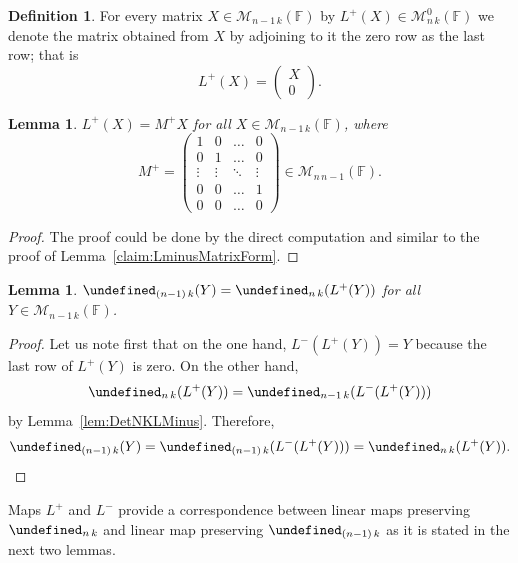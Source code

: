 \documentclass{elsarticle}
\def\F{{\mathbb F}}
\def\M{{\mathcal M}}
\let\det\undefined
\DeclareMathOperator{\det}{det}
\theoremstyle{plain}
\newtheorem{lemma}[theorem]{Lemma}
\theoremstyle{definition}
\newtheorem{definition}[theorem]{Definition}
\numberwithin{equation}{section}
\begin{document}
\begin{definition}\label{def:Lplus}
For every matrix $X \in \M_{n-1\,k}(\mathbb F)$ by $L^{+}(X) \in \M^0_{n\,k} (\mathbb F)$ we denote the matrix obtained from $X$ by adjoining to it the zero row as the last row; that is
\[
L^{+}(X) = \begin{pmatrix}X\\ 0
\end{pmatrix}.
\]
\end{definition}

\begin{lemma}\label{claim:LplusMatrixForm}$L^{+}(X) = M^{+}X$ for all $X \in \M_{n-1\,k}(\F)$, where
\[
M^{+} =
\begin{pmatrix}
1 & 0 & \ldots & 0\\
0 & 1 & \ldots & 0\\
\vdots & \vdots & \ddots & \vdots\\
0 & 0 & \ldots & 1\\
0 & 0 & \ldots & 0
\end{pmatrix}
\in \M_{n\,n-1}(\F).
\]
  \end{lemma}
  \begin{proof}The proof could be done by the direct computation and similar to the proof of Lemma~\ref{claim:LminusMatrixForm}.
  \end{proof}

\begin{lemma}\label{lem:DetNKLPlus}$\det_{(n-1)\,k}(Y) = \det_{n\,k}(L^{+}(Y))$ for all $Y \in \M_{n-1\,k}(\F)$.
  \end{lemma}
\begin{proof}
Let us note first that on the one hand, $L^{-}(L^{+}(Y)) = Y$ because the last row of $L^{+}(Y)$ is zero. On the other hand,
\[
\det_{n\,k}(L^{+}(Y)) = \det_{n-1\,k}(L^{-}(L^{+}(Y)))
\]
by Lemma~\ref{lem:DetNKLMinus}. Therefore, \[
\det_{(n-1)\,k}(Y) = \det_{(n-1)\,k}(L^{-}(L^{+}(Y))) = \det_{n\,k}(L^{+}(Y)).
\]
\end{proof}

Maps $L^{+}$ and $L^{-}$  provide a correspondence between linear maps preserving $\det_{n\,k}$ and linear map preserving $\det_{(n-1)\,k}$ as it is stated in the next two lemmas.
\end{document}
